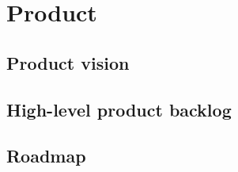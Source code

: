 \chapter{Product}

\section{Product vision}

\section{High-level product backlog}

\section{Roadmap}